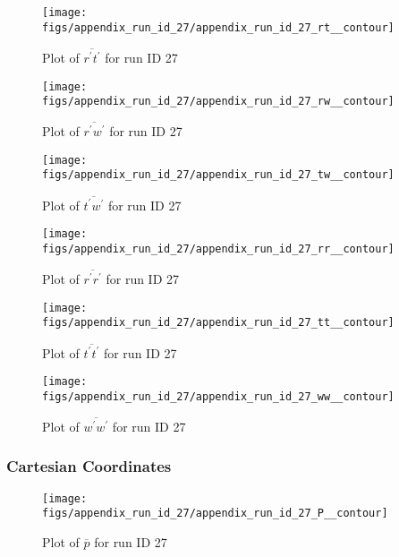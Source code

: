 \begin{figure}[H]
\centering
\texttt{[image: figs/appendix\_run\_id\_27/appendix\_run\_id\_27\_rt\_\_contour]}
\caption{Plot of $\overline{r^\prime t^\prime}$ for run ID 27}
\label{fig:appendix_run_id_27_rt__contour}
\end{figure}


\begin{figure}[H]
\centering
\texttt{[image: figs/appendix\_run\_id\_27/appendix\_run\_id\_27\_rw\_\_contour]}
\caption{Plot of $\overline{r^\prime w^\prime}$ for run ID 27}
\label{fig:appendix_run_id_27_rw__contour}
\end{figure}


\begin{figure}[H]
\centering
\texttt{[image: figs/appendix\_run\_id\_27/appendix\_run\_id\_27\_tw\_\_contour]}
\caption{Plot of $\overline{t^\prime w^\prime}$ for run ID 27}
\label{fig:appendix_run_id_27_tw__contour}
\end{figure}


\begin{figure}[H]
\centering
\texttt{[image: figs/appendix\_run\_id\_27/appendix\_run\_id\_27\_rr\_\_contour]}
\caption{Plot of $\overline{r^\prime r^\prime}$ for run ID 27}
\label{fig:appendix_run_id_27_rr__contour}
\end{figure}


\begin{figure}[H]
\centering
\texttt{[image: figs/appendix\_run\_id\_27/appendix\_run\_id\_27\_tt\_\_contour]}
\caption{Plot of $\overline{t^\prime t^\prime}$ for run ID 27}
\label{fig:appendix_run_id_27_tt__contour}
\end{figure}


\begin{figure}[H]
\centering
\texttt{[image: figs/appendix\_run\_id\_27/appendix\_run\_id\_27\_ww\_\_contour]}
\caption{Plot of $\overline{w^\prime w^\prime}$ for run ID 27}
\label{fig:appendix_run_id_27_ww__contour}
\end{figure}


\subsubsection{Cartesian Coordinates}
\begin{figure}[H]
\centering
\texttt{[image: figs/appendix\_run\_id\_27/appendix\_run\_id\_27\_P\_\_contour]}
\caption{Plot of $\overline{p}$ for run ID 27}
\label{fig:appendix_run_id_27_P__contour}
\end{figure}



